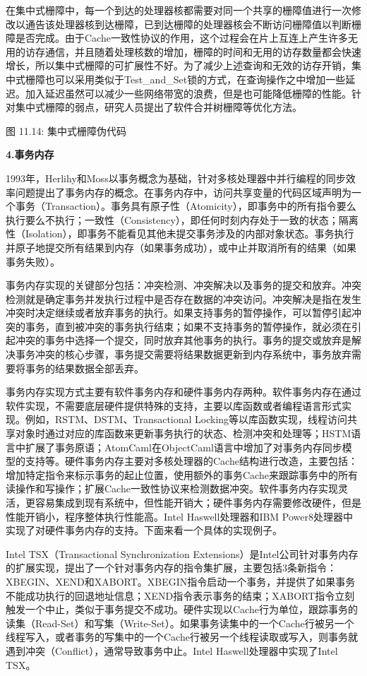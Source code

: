 \documentclass[]{ctexbook}
\begin{document}
在集中式栅障中，每一个到达的处理器核都需要对同一个共享的栅障值进行一次修改以通告该处理器核到达栅障，已到达栅障的处理器核会不断访问栅障值以判断栅障是否完成。由于Cache一致性协议的作用，这个过程会在片上互连上产生许多无用的访存通信，并且随着处理核数的增加，栅障的时间和无用的访存数量都会快速增长，所以集中式栅障的可扩展性不好。为了减少上述查询和无效的访存开销，集中式栅障也可以采用类似于Test\_and\_Set锁的方式，在查询操作之中增加一些延迟。加入延迟虽然可以减少一些网络带宽的浪费，但是也可能降低栅障的性能。针对集中式栅障的弱点，研究人员提出了软件合并树栅障等优化方法。

图 11.14: 集中式栅障伪代码

\textbf{4.事务内存}

1993年，Herlihy和Moss以事务概念为基础，针对多核处理器中并行编程的同步效率问题提出了事务内存的概念。在事务内存中，访问共享变量的代码区域声明为一个事务（Transaction）。事务具有原子性（Atomicity），即事务中的所有指令要么执行要么不执行；一致性（Consistency），即任何时刻内存处于一致的状态；隔离性（Isolation），即事务不能看见其他未提交事务涉及的内部对象状态。事务执行并原子地提交所有结果到内存（如果事务成功），或中止并取消所有的结果（如果事务失败）。

事务内存实现的关键部分包括：冲突检测、冲突解决以及事务的提交和放弃。冲突检测就是确定事务并发执行过程中是否存在数据的冲突访问。冲突解决是指在发生冲突时决定继续或者放弃事务的执行。如果支持事务的暂停操作，可以暂停引起冲突的事务，直到被冲突的事务执行结束；如果不支持事务的暂停操作，就必须在引起冲突的事务中选择一个提交，同时放弃其他事务的执行。事务的提交或放弃是解决事务冲突的核心步骤，事务提交需要将结果数据更新到内存系统中，事务放弃需要将事务的结果数据全部丢弃。

事务内存实现方式主要有软件事务内存和硬件事务内存两种。软件事务内存在通过软件实现，不需要底层硬件提供特殊的支持，主要以库函数或者编程语言形式实现。例如，RSTM、DSTM、Transactional Locking等以库函数实现，线程访问共享对象时通过对应的库函数来更新事务执行的状态、检测冲突和处理等；HSTM语言中扩展了事务原语；AtomCaml在ObjectCaml语言中增加了对事务内存同步模型的支持等。硬件事务内存主要对多核处理器的Cache结构进行改造，主要包括：增加特定指令来标示事务的起止位置，使用额外的事务Cache来跟踪事务中的所有读操作和写操作；扩展Cache一致性协议来检测数据冲突。软件事务内存实现灵活，更容易集成到现有系统中，但性能开销大；硬件事务内存需要修改硬件，但是性能开销小，程序整体执行性能高。Intel Haswell处理器和IBM Power8处理器中实现了对硬件事务内存的支持。下面来看一个具体的实现例子。

Intel TSX（Transactional Synchronization Extensions）是Intel公司针对事务内存的扩展实现，提出了一个针对事务内存的指令集扩展，主要包括3条新指令：XBEGIN、XEND和XABORT。XBEGIN指令启动一个事务，并提供了如果事务不能成功执行的回退地址信息；XEND指令表示事务的结束；XABORT指令立刻触发一个中止，类似于事务提交不成功。硬件实现以Cache行为单位，跟踪事务的读集（Read-Set）和写集（Write-Set）。如果事务读集中的一个Cache行被另一个线程写入，或者事务的写集中的一个Cache行被另一个线程读取或写入，则事务就遇到冲突（Conflict），通常导致事务中止。Intel Haswell处理器中实现了Intel TSX。
\end{document}
